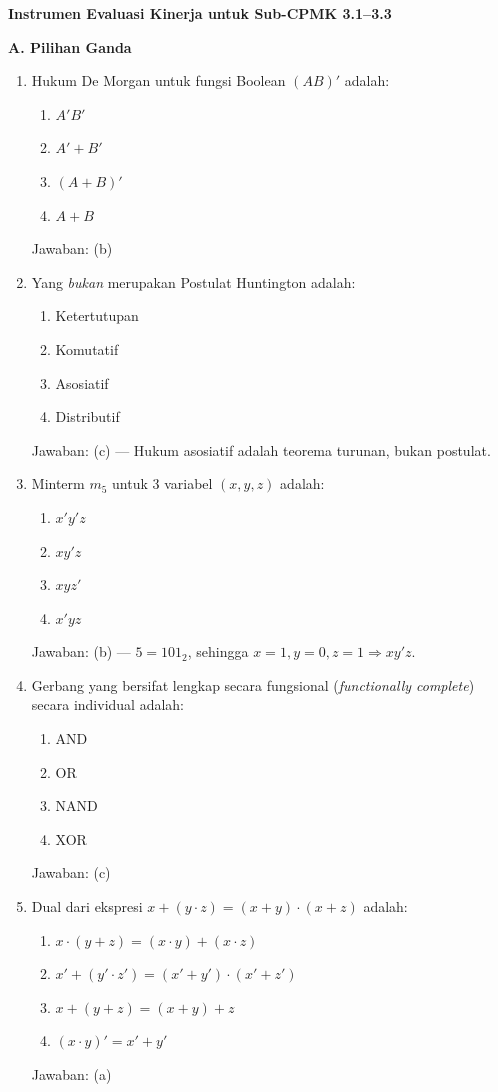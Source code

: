 \documentclass[../main]{subfiles}
\begin{document}
\begin{asesmen}
\textbf{Instrumen Evaluasi Kinerja untuk Sub-CPMK 3.1--3.3}

\textbf{A. Pilihan Ganda}
\begin{enumerate}
  \item Hukum De Morgan untuk fungsi Boolean $(AB)' $ adalah:
  \begin{enumerate}
    \item $A'B'$
    \item $A' + B'$
    \item $(A+B)'$
    \item $A+B$
  \end{enumerate}
  Jawaban: (b)

  \item Yang \emph{bukan} merupakan Postulat Huntington adalah:
  \begin{enumerate}
    \item Ketertutupan
    \item Komutatif
    \item Asosiatif
    \item Distributif
  \end{enumerate}
  Jawaban: (c) --- Hukum asosiatif adalah teorema turunan, bukan postulat.

  \item Minterm $m_5$ untuk 3 variabel $(x, y, z)$ adalah:
  \begin{enumerate}
    \item $x'y'z$
    \item $xy'z$
    \item $xyz'$
    \item $x'yz$
  \end{enumerate}
  Jawaban: (b) --- $5 = 101_2$, sehingga $x = 1, y = 0, z = 1 \Rightarrow xy'z$.

  \item Gerbang yang bersifat lengkap secara fungsional (\textit{functionally complete}) secara individual adalah:
  \begin{enumerate}
    \item AND
    \item OR
    \item NAND
    \item XOR
  \end{enumerate}
  Jawaban: (c)

  \item Dual dari ekspresi $x + (y \cdot z) = (x + y) \cdot (x + z)$ adalah:
  \begin{enumerate}
    \item $x \cdot (y + z) = (x \cdot y) + (x \cdot z)$
    \item $x' + (y' \cdot z') = (x' + y') \cdot (x' + z')$
    \item $x + (y + z) = (x + y) + z$
    \item $(x \cdot y)' = x' + y'$
  \end{enumerate}
  Jawaban: (a)
\end{enumerate}


\end{asesmen}
\end{document}
